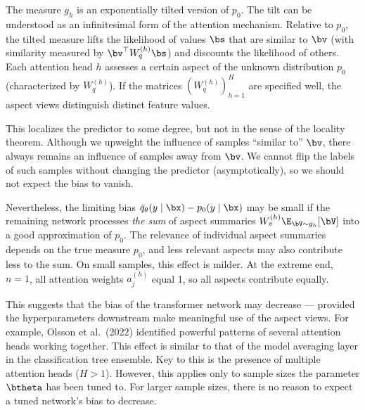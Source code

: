 \documentclass[aspectratio=169,10pt]{beamer}
\newcommand{\currentheading}{\ifx\insertsubsection\empty\insertsection\else\insertsubsection\fi}
\begin{document}
\begin{frame}{\currentheading}
The measure $g_h$ is an exponentially tilted version of $p_0$. The tilt can be understood as an infinitesimal form of the attention mechanism. Relative to $p_0$, the tilted measure lifts the likelihood of values $\bs$ that are similar to $\bv$ (with similarity measured by $\bv^\top W_{q}^{(h)} \bs$) and discounts the likelihood of others. Each attention head $h$ assesses a certain aspect of the unknown distribution $p_0$ (characterized by $W_{q}^{(h)}$). If the matrices $(W_{q}^{(h)})_{h = 1}^H$ are specified well, the aspect views distinguish distinct feature values.
\end{frame}

\begin{frame}{\currentheading}
This localizes the predictor to some degree, but not in the sense of the locality theorem. Although we upweight the influence of samples ``similar to'' $\bv$, there always remains an influence of samples away from $\bv$. We cannot flip the labels of such samples without changing the predictor (asymptotically), so we should not expect the bias to vanish.
\end{frame}

\begin{frame}{\currentheading}
Nevertheless, the limiting bias $\bar q_{\theta}(y \mid  \bx) - p_0(y \mid \bx)$ may be small if the remaining network processes \emph{the sum} of aspect summaries $W_{v}^{(h)} \E_{\bV \sim g_h}[\bV]$ into a good approximation of $p_0$. The relevance of individual aspect summaries depends on the true measure $p_0$, and less relevant aspects may also contribute less to the sum. On small samples, this effect is milder. At the extreme end, $n = 1$, all attention weights $a_j^{(h)}$ equal 1, so all aspects contribute equally.
\end{frame}

\begin{frame}{\currentheading}
This suggests that the bias of the transformer network may decrease --- provided the hyperparameters downstream make meaningful use of the aspect views. For example, Olsson et al.\ (2022) identified powerful patterns of several attention heads working together. This effect is similar to that of the model averaging layer in the classification tree ensemble. Key to this is the presence of multiple attention heads ($H > 1$). However, this applies only to sample sizes the parameter $\btheta$ has been tuned to. For larger sample sizes, there is no reason to expect a tuned network's bias to decrease.
\end{frame}
\end{document}
